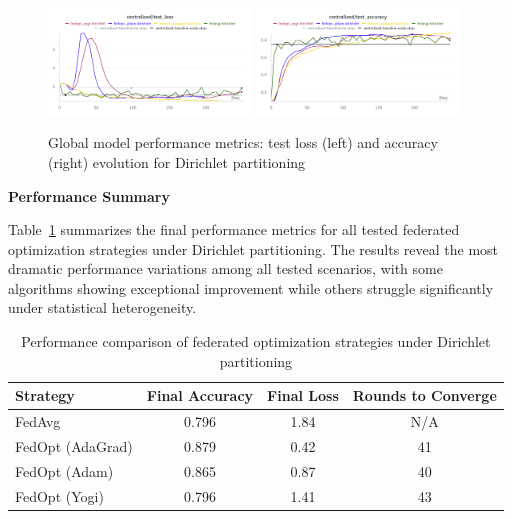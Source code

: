 \documentclass[11pt]{article}
\begin{document}
    \begin{figure}[h]
        \centering
        \includegraphics[width=0.48\textwidth]{img/experiment_1/dirichlet_server_test_loss}
        \hfill
        \includegraphics[width=0.48\textwidth]{img/experiment_1/dirichlet_server_test_acc}
        \caption{Global model performance metrics: test loss (left) and accuracy (right) evolution for Dirichlet partitioning}
        \label{fig:dirichlet_global_metrics}
    \end{figure}

    \noindent
    \textbf{Performance Summary}

    Table~\ref{tab:dirichlet_performance} summarizes the final performance metrics for all tested federated optimization strategies under Dirichlet partitioning. The results reveal the most dramatic performance variations among all tested scenarios, with some algorithms showing exceptional improvement while others struggle significantly under statistical heterogeneity.

    \begin{table}[h]
        \centering
        \caption{Performance comparison of federated optimization strategies under Dirichlet partitioning}
        \label{tab:dirichlet_performance}
        \begin{tabular}{|l|c|c|c|}
            \hline
            \textbf{Strategy} & \textbf{Final Accuracy} & \textbf{Final Loss} & \textbf{Rounds to Converge} \\
            \hline
            FedAvg            & 0.796                   & 1.84                & N/A                         \\
            FedOpt (AdaGrad)  & 0.879                   & 0.42                & 41                          \\
            FedOpt (Adam)     & 0.865                   & 0.87                & 40                          \\
            FedOpt (Yogi)     & 0.796                   & 1.41                & 43                          \\
            \hline
        \end{tabular}
    \end{table}
\end{document}
